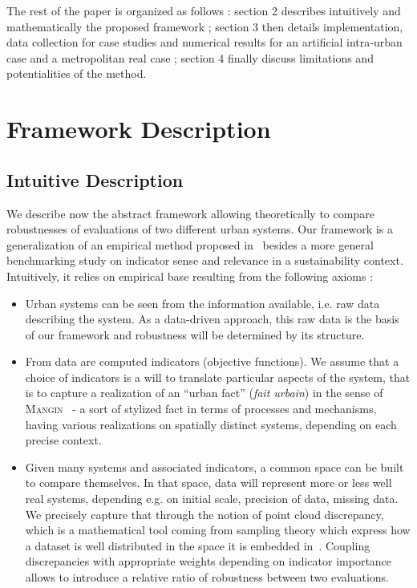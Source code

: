 \documentclass[runningheads,a4paper]{llncs2e/llncs}
\newcommand{\noun}[1]{\textsc{#1}}
\begin{document}
\bigskip

The rest of the paper is organized as follows : section 2 describes intuitively and mathematically the proposed framework ; section 3 then details implementation, data collection for case studies and numerical results for an artificial intra-urban case and a metropolitan real case ; section 4 finally discuss limitations and potentialities of the method.





\section{Framework Description}


\subsection{Intuitive Description}


We describe now the abstract framework allowing theoretically to compare robustnesses of evaluations of two different urban systems. Our framework is a generalization of an empirical method proposed in~\cite{ecodistrictReport} besides a more general benchmarking study on indicator sense and relevance in a sustainability context. Intuitively, it relies on empirical base resulting from the following axioms :
\begin{itemize}
\item Urban systems can be seen from the information available, i.e. raw data describing the system. As a data-driven approach, this raw data is the basis of our framework and robustness will be determined by its structure.
\item From data are computed indicators (objective functions). We assume that a choice of indicators is a will to translate particular aspects of the system, that is to capture a realization of an ``urban fact'' (\emph{fait urbain}) in the sense of \noun{Mangin}~\cite{mangin1999projet} - a sort of stylized fact in terms of processes and mechanisms, having various realizations on spatially distinct systems, depending on each precise context.
\item Given many systems and associated indicators, a common space can be built to compare themselves. In that space, data will represent more or less well real systems, depending e.g. on initial scale, precision of data, missing data. We precisely capture that through the notion of point cloud discrepancy, which is a mathematical tool coming from sampling theory which express how a dataset is well distributed in the space it is embedded in~\cite{dick2010digital}. Coupling discrepancies with appropriate weights depending on indicator importance allows to introduce a relative ratio of robustness between two evaluations.
\end{itemize}
\end{document}

